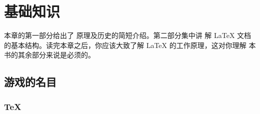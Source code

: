 \chapter{基础知识}
\begin{intro}
本章的第一部分给出了 \LaTeXe{} 原理及历史的简短介绍。第二部分集中讲
解 \LaTeX{} 文档的基本结构。读完本章之后，你应该大致了解 \LaTeX{} 的工作原理，这对你理解
本书的其余部分来说是必须的。
\end{intro}

\section{游戏的名目}
\subsection{\TeX}



